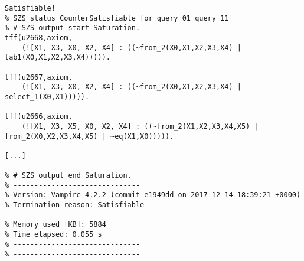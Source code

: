 \documentclass[magisterska,en]{pracamgr}
\begin{document}
\begin{lstlisting}[caption=Example partial output for Vampire for two not equivalent queries (Query 1 and Query 11)]
Satisfiable!
% SZS status CounterSatisfiable for query_01_query_11
% # SZS output start Saturation.
tff(u2668,axiom,
    (![X1, X3, X0, X2, X4] : ((~from_2(X0,X1,X2,X3,X4) | tab1(X0,X1,X2,X3,X4))))).

tff(u2667,axiom,
    (![X1, X3, X0, X2, X4] : ((~from_2(X0,X1,X2,X3,X4) | select_1(X0,X1))))).

tff(u2666,axiom,
    (![X1, X3, X5, X0, X2, X4] : ((~from_2(X1,X2,X3,X4,X5) | from_2(X0,X2,X3,X4,X5) | ~eq(X1,X0))))).

[...]

% # SZS output end Saturation.
% ------------------------------
% Version: Vampire 4.2.2 (commit e1949dd on 2017-12-14 18:39:21 +0000)
% Termination reason: Satisfiable

% Memory used [KB]: 5884
% Time elapsed: 0.055 s
% ------------------------------
% ------------------------------

\end{lstlisting}
\vfill
\pagebreak
\end{document}
